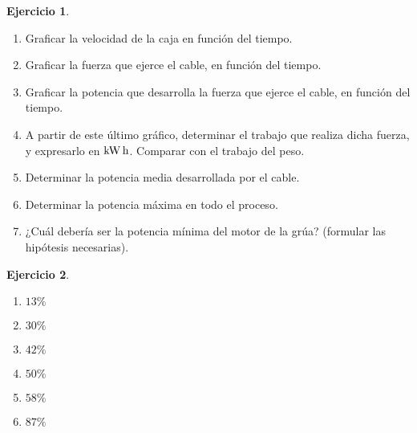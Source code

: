 \documentclass[a4paper,12pt,twoside]{book}
\newtheorem{ejercicio}{{Ejercicio}}[chapter]
\begin{document}
\begin{mdframed}[style=ejercicio-intermedio]
    \begin{ejercicio}
    \end{ejercicio}
    \begin{enumerate}
        \item Graficar la velocidad de la caja en función del tiempo.
        \item Graficar la fuerza que ejerce el cable, en función del tiempo.
        \item Graficar la potencia que desarrolla la fuerza que ejerce el cable, en función del tiempo.
        \item A partir de este último gráfico, determinar el trabajo que realiza dicha fuerza, y expresarlo
        en $\si{\kilo\watt\hour}$. Comparar con el trabajo del peso.
        \item Determinar la potencia media desarrollada por el cable.
        \item Determinar la potencia máxima en todo el proceso.
        \item ¿Cuál debería ser la potencia mínima del motor de la grúa? (formular las hipótesis
        necesarias).
    \end{enumerate}
\end{mdframed}

\begin{mdframed}[style=ejercicio-facil]
    \begin{ejercicio}
    \end{ejercicio}
    \begin{enumerate}
        \item $13\%$
        \item $30\%$
        \item $42\%$
        \item $50\%$
        \item $58\%$
        \item $87\%$
    \end{enumerate}
\end{mdframed}
\end{document}
